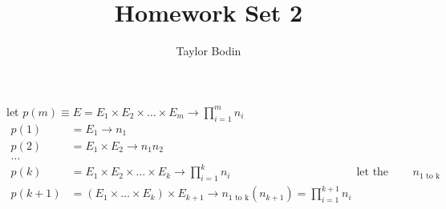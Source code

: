 \documentclass[12pt]{article}
\newenvironment{problem}[2][Problem]{\begin{trivlist}
\item[\hskip \labelsep {\bfseries #1}\hskip \labelsep {\bfseries #2.}]
  \vspace{1 cm}
}{\end{trivlist}}
\begin{document}
\title{Homework Set 2}
\author{Taylor Bodin}
\maketitle
 
\begin{problem}{2.29} 
\item let $p(m) \equiv E = E_1 \times E_2 \times \dots \times E_m  \rightarrow
  \prod_{i=1}^m n_i$ \\
  \begin{align*}
  p(1) &= E_1 \rightarrow n_1 \\
  p(2) &= E_1 \times E_2 \rightarrow n_1n_2 \\
  \dots \\
  p(k) &= E_1 \times E_2 \times \dots \times E_k \rightarrow \prod_{i=1}^k n_i
  & & \textrm{let the product equal } n_{\textrm{1 to k}} \\
  p(k+1) &= (E_1 \times \dots \times E_k) \times E_{k+1} \rightarrow 
  n_{\textrm{1 to k}}(n_{k+1}) = \prod_{i=1}^{k+1} n_i
  \end{align*}
\end{problem}
\end{document}
